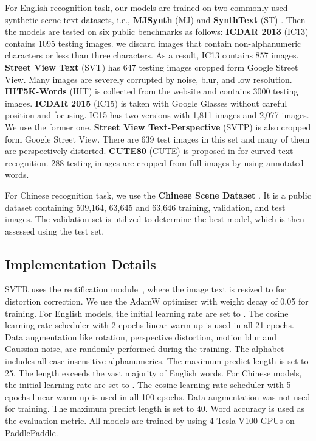 \documentclass{article}
\begin{document}
For English recognition task, our models are trained on two commonly used synthetic scene text datasets, i.e., {\bf MJSynth} (MJ) \cite{jaderberg14synthetic,Jaderberg2015ReadingTI} and {\bf SynthText} (ST) \cite{Synthetic}. Then the models are tested on six public benchmarks as follows: {\bf ICDAR 2013} (IC13) \cite{icdar2013} contains 1095 testing images. we discard images that contain non-alphanumeric characters or less than three characters. As a result, IC13 contains 857 images. {\bf Street View Text} (SVT) \cite{Wang2011SVT} has 647 testing images cropped form Google Street View. Many images are severely corrupted by noise, blur, and low resolution. {\bf IIIT5K-Words} (IIIT) \cite{IIIT5K} is collected from the website and contains 3000 testing images. {\bf ICDAR 2015} (IC15) \cite{icdar2015} is taken with Google Glasses without careful position and focusing. IC15 has two versions with 1,811 images and 2,077 images. We use the former one. {\bf Street View Text-Perspective} (SVTP) \cite{SVTP} is also cropped form Google Street View. There are 639 test images in this set and many of them are perspectively distorted. {\bf CUTE80} (CUTE) is proposed in\cite{Risnumawan2014cute} for curved text recognition. 288 testing images are cropped from full images by using annotated words.

For Chinese recognition task, we use the {\bf Chinese Scene Dataset} \cite{chen2021benchmarking}. It is a public dataset containing 509,164, 63,645 and 63,646 training, validation, and test images. 
The validation set is utilized to determine the best model, which is then assessed using the test set.

\subsection{Implementation Details}

SVTR uses the rectification module~\cite{shi2019aster}, where the image text is resized to  for distortion correction.
We use the AdamW optimizer with weight decay of 0.05 for training. For English models, the initial learning rate are set to . The cosine learning rate scheduler with 2 epochs linear warm-up is used in all 21 epochs. Data augmentation like rotation, perspective distortion, motion blur and Gaussian noise, are randomly performed during the training. The alphabet includes all case-insensitive alphanumerics. The maximum predict length is set to 25. The length exceeds the vast majority of English words. For Chinese models, the initial learning rate are set to . The cosine learning rate scheduler with 5 epochs linear warm-up is used in all 100 epochs. Data augmentation was not used for training. The maximum predict length is set to 40. Word accuracy is used as the evaluation metric. All models are trained by using 4 Tesla V100 GPUs on PaddlePaddle.
\end{document}

